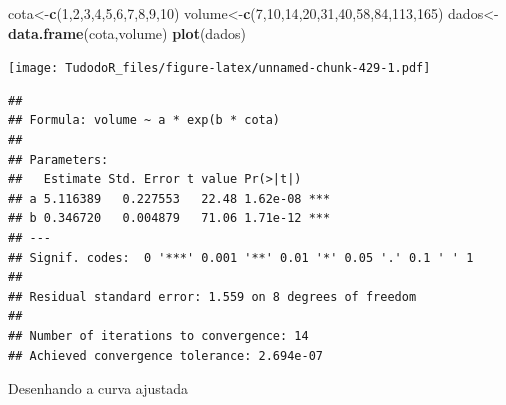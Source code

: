 \documentclass[
]{book}
\newenvironment{Shaded}{\begin{snugshade}}{\end{snugshade}}
\newcommand{\CommentTok}[1]{\textcolor[rgb]{0.56,0.35,0.01}{\textit{#1}}}
\newcommand{\DataTypeTok}[1]{\textcolor[rgb]{0.13,0.29,0.53}{#1}}
\newcommand{\DecValTok}[1]{\textcolor[rgb]{0.00,0.00,0.81}{#1}}
\newcommand{\KeywordTok}[1]{\textcolor[rgb]{0.13,0.29,0.53}{\textbf{#1}}}
\newcommand{\NormalTok}[1]{#1}
\newcommand{\OperatorTok}[1]{\textcolor[rgb]{0.81,0.36,0.00}{\textbf{#1}}}
\newcommand{\StringTok}[1]{\textcolor[rgb]{0.31,0.60,0.02}{#1}}
\begin{document}
\begin{Shaded}
\begin{Highlighting}[]
\NormalTok{cota<-}\KeywordTok{c}\NormalTok{(}\DecValTok{1}\NormalTok{,}\DecValTok{2}\NormalTok{,}\DecValTok{3}\NormalTok{,}\DecValTok{4}\NormalTok{,}\DecValTok{5}\NormalTok{,}\DecValTok{6}\NormalTok{,}\DecValTok{7}\NormalTok{,}\DecValTok{8}\NormalTok{,}\DecValTok{9}\NormalTok{,}\DecValTok{10}\NormalTok{) }
\NormalTok{volume<-}\KeywordTok{c}\NormalTok{(}\DecValTok{7}\NormalTok{,}\DecValTok{10}\NormalTok{,}\DecValTok{14}\NormalTok{,}\DecValTok{20}\NormalTok{,}\DecValTok{31}\NormalTok{,}\DecValTok{40}\NormalTok{,}\DecValTok{58}\NormalTok{,}\DecValTok{84}\NormalTok{,}\DecValTok{113}\NormalTok{,}\DecValTok{165}\NormalTok{) }
\NormalTok{dados<-}\KeywordTok{data.frame}\NormalTok{(cota,volume) }
\KeywordTok{plot}\NormalTok{(dados)}
\end{Highlighting}
\end{Shaded}

\texttt{[image: TudodoR\_files/figure-latex/unnamed-chunk-429-1.pdf]}

\begin{Shaded}
\end{Shaded}

\begin{verbatim}
## 
## Formula: volume ~ a * exp(b * cota)
## 
## Parameters:
##   Estimate Std. Error t value Pr(>|t|)    
## a 5.116389   0.227553   22.48 1.62e-08 ***
## b 0.346720   0.004879   71.06 1.71e-12 ***
## ---
## Signif. codes:  0 '***' 0.001 '**' 0.01 '*' 0.05 '.' 0.1 ' ' 1
## 
## Residual standard error: 1.559 on 8 degrees of freedom
## 
## Number of iterations to convergence: 14 
## Achieved convergence tolerance: 2.694e-07
\end{verbatim}

Desenhando a curva ajustada
\end{document}
